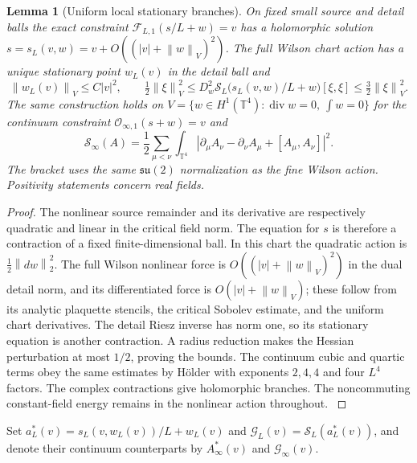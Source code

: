 \documentclass[11pt,oneside,openany]{book}
\newtheorem{lemma}[lemma]{Lemma}
\theoremstyle{definition}
\theoremstyle{remark}
\newcommand{\T}{\mathbb T}
\newcommand{\norm}[1]{\left\lVert#1\right\rVert}
\newcommand{\src}[2]{\cite[#2]{#1}}
\begin{document}
\begin{lemma}[Uniform local stationary branches]
\label{lem:classical-branches}
On fixed small source and detail balls the exact constraint
$\mathcal F_{L,1}(s/L+w)=v$ has a holomorphic solution
$s=s_L(v,w)=v+O((|v|+\norm{w}_V)^2)$. The full Wilson chart action
has a unique stationary point $w_L(v)$ in the detail ball and
\begin{equation}
 \norm{w_L(v)}_V\le C|v|^2,\qquad
 \tfrac12\norm{\xi}_V^2\le
 D_w^2\mathcal S_L\bigl(s_L(v,w)/L+w\bigr)[\xi,\xi]
                  \le\tfrac32\norm{\xi}_V^2.
 \label{eq:classical-branch-convexity}
\end{equation}
The same construction holds on
$V=\{w\in H^1(\T^4):\operatorname{div}w=0,\ \int w=0\}$
for the continuum constraint $\mathcal O_{\infty,1}(s+w)=v$ and
\begin{equation}
 \mathcal S_\infty(A)=\frac12\sum_{\mu<\nu}\int_{\T^4}
 |\partial_\mu A_\nu-\partial_\nu A_\mu+[A_\mu,A_\nu]|^2.
 \label{eq:classical-continuum-action}
\end{equation}
The bracket uses the same $\mathfrak{su}(2)$ normalization as the
fine Wilson action. Positivity statements concern real fields.
\end{lemma}
\begin{proof}
The nonlinear source remainder and its derivative are respectively
quadratic and linear in the critical field norm. The equation for
$s$ is therefore a contraction of a fixed finite-dimensional ball.
In this chart the quadratic action is $\tfrac12\norm{dw}_2^2$.
The full Wilson nonlinear force is $O((|v|+\norm{w}_V)^2)$ in the
dual detail norm, and its differentiated force is
$O(|v|+\norm{w}_V)$; these follow from its analytic plaquette
stencils, the critical Sobolev estimate, and the uniform chart
derivatives. The detail Riesz inverse has norm one, so its
stationary equation is another contraction. A radius reduction
makes the Hessian perturbation at most $1/2$, proving the bounds.
The continuum cubic and quartic terms obey the same estimates by
H\"older with exponents $2,4,4$ and four $L^4$ factors. The
complex contractions give holomorphic branches. The noncommuting
constant-field energy remains in the nonlinear action throughout.
\src{SM}{V9, V12--V13}
\end{proof}

Set $a_L^*(v)=s_L(v,w_L(v))/L+w_L(v)$ and
$\mathcal G_L(v)=\mathcal S_L(a_L^*(v))$, and denote their
continuum counterparts by $A_\infty^*(v)$ and $\mathcal G_\infty(v)$.
\end{document}
